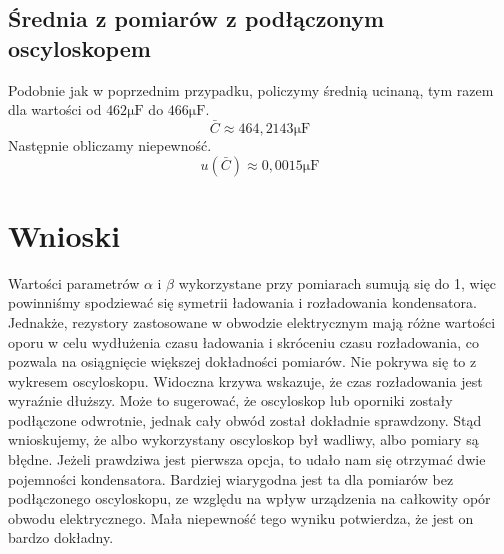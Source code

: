\documentclass[12pt]{mwart}
\begin{document}
	\subsection{Średnia z pomiarów z podłączonym oscyloskopem}
	\noindent Podobnie jak w poprzednim przypadku, policzymy średnią ucinaną, tym razem dla wartości od $462\mathrm{\mu F}$ do $466\mathrm{\mu F}$.
	$$ \bar{C} \approx 464,2143\mathrm{\mu F} $$
	Następnie obliczamy niepewność.
	$$ u(\bar{C}) \approx 0,0015\mathrm{\mu F} $$
	
	\section{Wnioski}
	\noindent Wartości parametrów $\alpha$ i $\beta$ wykorzystane przy pomiarach sumują się do 1, więc powinniśmy spodziewać się symetrii ładowania i rozładowania kondensatora. Jednakże, rezystory zastosowane w obwodzie elektrycznym mają różne wartości oporu w celu wydłużenia czasu ładowania i skróceniu czasu rozładowania, co pozwala na osiągnięcie większej dokładności pomiarów. Nie pokrywa się to z wykresem oscyloskopu. Widoczna krzywa wskazuje, że czas rozładowania jest wyraźnie dłuższy. Może to sugerować, że oscyloskop lub oporniki zostały podłączone odwrotnie, jednak cały obwód został dokładnie sprawdzony. Stąd wnioskujemy, że albo wykorzystany oscyloskop był wadliwy, albo pomiary są błędne. Jeżeli prawdziwa jest pierwsza opcja, to udało nam się otrzymać dwie pojemności kondensatora. Bardziej wiarygodna jest ta dla pomiarów bez podłączonego oscyloskopu, ze względu na wpływ urządzenia na całkowity opór obwodu elektrycznego. Mała niepewność tego wyniku potwierdza, że jest on bardzo dokładny. 
\end{document}
